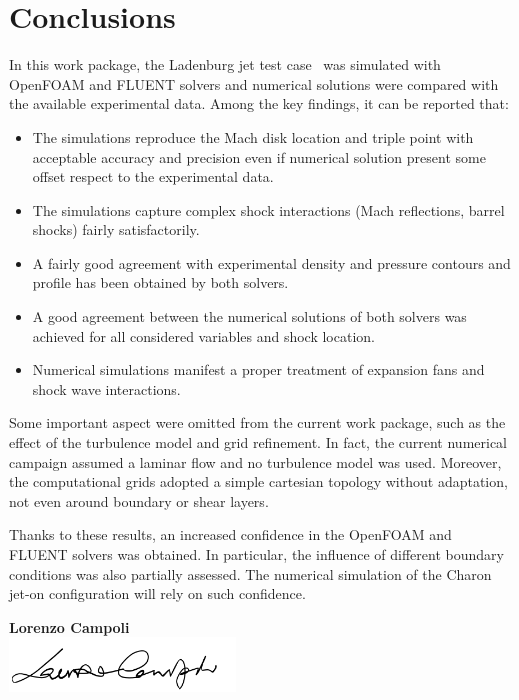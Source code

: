 \documentclass[12pt]{article}
\begin{document}
\newpage 

\section{Conclusions}\label{sec:conclusions}
In this work package, the Ladenburg jet test case~\cite{ladenburg1949interferometric} was  simulated with OpenFOAM and FLUENT solvers and numerical solutions were compared with the available experimental data. Among the key findings, it can be reported that:

\begin{itemize}
    \item The simulations reproduce the Mach disk location and triple point with acceptable accuracy and precision even if numerical solution present some offset respect to the experimental data.
    \item The simulations capture complex shock interactions (Mach reflections, barrel shocks) fairly satisfactorily.
    \item A fairly good agreement with experimental density and pressure contours and profile has been obtained by both solvers.
    \item A good agreement between the numerical solutions of both solvers was achieved for all considered variables and shock location.
    \item Numerical simulations manifest a proper treatment of expansion fans and shock wave interactions.
\end{itemize}

Some important aspect were omitted from the current work package, such as the effect of the turbulence model and grid refinement. In fact, the current numerical campaign assumed a laminar flow and no turbulence model was used. Moreover, the computational grids adopted a simple cartesian topology without adaptation, not even around boundary or shear layers.

Thanks to these results, an increased confidence in the OpenFOAM and FLUENT solvers was obtained. In particular, the influence of different boundary conditions was also partially assessed. The numerical simulation of the Charon jet-on configuration will rely on such confidence.

\vspace{\fill}
\begin{center}
    \hspace*{9.0cm} \LARGE \textbf{Lorenzo Campoli} \\
    \hspace*{9.0cm}\includegraphics[width=0.45\textwidth]{signature/signature0.png}
\end{center}
\end{document}
